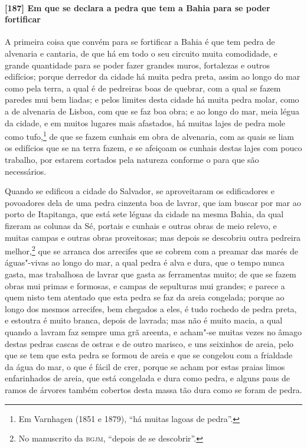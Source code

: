 \paragraph{[187] Em que se declara a pedra que tem a Bahia para se poder fortificar}\quad
A primeira coisa que convém para se fortificar a Bahia é que tem pedra de alvenaria e
cantaria, de que há em todo o seu circuito muita comodidade, e grande quantidade para se
poder fazer grandes muros, fortalezas e outros edifícios; porque derredor da cidade há
muita pedra preta, assim ao longo do mar como pela terra, a qual é de pedreiras boas de
quebrar, com a qual se fazem paredes mui bem liadas; e pelos limites desta cidade há muita
pedra molar, como a de alvenaria de Lisboa, com que se faz boa obra; e ao longo do mar,
meia légua da cidade, e em muitos lugares mais afastados, há muitas lajes de pedra mole
como tufo,\footnote{ Em Varnhagen (1851 e 1879), ``há muitas lagoas de pedra''.} de que se
fazem cunhais em obra de alvenaria, com as quais se liam os edifícios que se na terra
fazem, e se afeiçoam os cunhais destas lajes com pouco trabalho, por estarem cortados pela
natureza conforme o para que são necessários.

Quando se edificou a cidade do Salvador, se aproveitaram os edificadores e povoadores dela
de uma pedra cinzenta boa de lavrar, que iam buscar por mar ao porto de Itapitanga, que
está sete léguas da cidade na mesma Bahia, da qual fizeram as colunas da Sé, portais e
cunhais e outras obras de meio relevo, e muitas campas e outras obras proveitosas; mas
depois se descobriu outra pedreira melhor,\footnote{ No manuscrito da \textsc{bgjm},
``depois de se descobrir''.} que se arranca dos arrecifes que se cobrem com a preamar das
marés de águas"-vivas ao longo do mar, a qual pedra é alva e dura, que o tempo nunca gasta,
mas trabalhosa de lavrar que gasta as ferramentas muito; de que se fazem obras mui primas
e formosas, e campas de sepulturas mui grandes; e parece a quem nisto tem atentado que
esta pedra se faz da areia congelada; porque ao longo dos mesmos arrecifes, bem chegados a
eles, é tudo rochedo de pedra preta, e estoutra é muito branca, depois de lavrada; mas não
é muito macia, a qual quando a lavram faz sempre uma grã areenta, e acham"-se muitas vezes
no âmago destas pedras cascas de ostras e de outro marisco, e uns seixinhos de areia, pelo
que se tem que esta pedra se formou de areia e que se congelou com a frialdade da água do
mar, o que é fácil de crer, porque se acham por estas praias limos enfarinhados de areia,
que está congelada e dura como pedra, e alguns paus de ramos de árvores também cobertos
desta massa tão dura como se foram de pedra.

